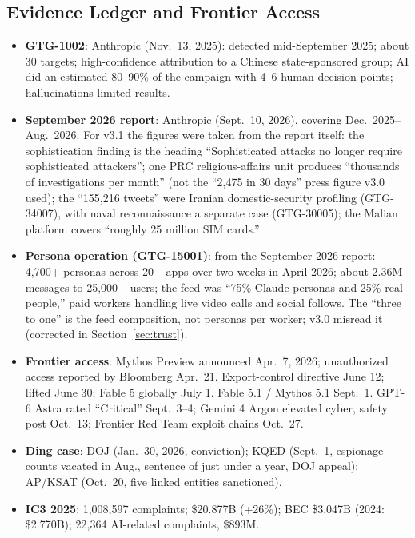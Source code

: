 \documentclass[11pt,letterpaper]{article}
\begin{document}
\subsection*{Evidence Ledger and Frontier Access}
\begin{itemize}
  \item \textbf{GTG-1002}: Anthropic (Nov.\ 13, 2025): detected mid-September 2025; about 30 targets; high-confidence attribution to a Chinese state-sponsored group; AI did an estimated 80--90\% of the campaign with 4--6 human decision points; hallucinations limited results.
  \item \textbf{September 2026 report}: Anthropic (Sept.\ 10, 2026), covering Dec.\ 2025--Aug.\ 2026. For v3.1 the figures were taken from the report itself: the sophistication finding is the heading ``Sophisticated attacks no longer require sophisticated attackers''; one PRC religious-affairs unit produces ``thousands of investigations per month'' (not the ``2,475 in 30 days'' press figure v3.0 used); the ``155,216 tweets'' were Iranian domestic-security profiling (GTG-34007), with naval reconnaissance a separate case (GTG-30005); the Malian platform covers ``roughly 25 million SIM cards.''
  \item \textbf{Persona operation (GTG-15001)}: from the September 2026 report: 4,700+ personas across 20+ apps over two weeks in April 2026; about 2.36M messages to 25,000+ users; the feed was ``75\% Claude personas and 25\% real people,'' paid workers handling live video calls and social follows. The ``three to one'' is the feed composition, not personas per worker; v3.0 misread it (corrected in Section~\ref{sec:trust}).
  \item \textbf{Frontier access}: Mythos Preview announced Apr.\ 7, 2026; unauthorized access reported by Bloomberg Apr.\ 21. Export-control directive June 12; lifted June 30; Fable 5 globally July 1. Fable 5.1 / Mythos 5.1 Sept.\ 1. GPT-6 Astra rated ``Critical'' Sept.\ 3--4; Gemini 4 Argon elevated cyber, safety post Oct.\ 13; Frontier Red Team exploit chains Oct.\ 27.
  \item \textbf{Ding case}: DOJ (Jan.\ 30, 2026, conviction); KQED (Sept.\ 1, espionage counts vacated in Aug., sentence of just under a year, DOJ appeal); AP/KSAT (Oct.\ 20, five linked entities sanctioned).
  \item \textbf{IC3 2025}: 1,008,597 complaints; \$20.877B (+26\%); BEC \$3.047B (2024: \$2.770B); 22,364 AI-related complaints, \$893M.

\end{itemize}
\end{document}
